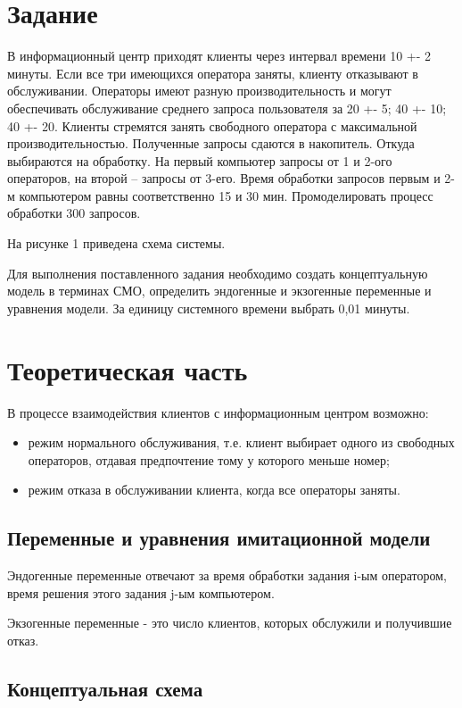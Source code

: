 
\section*{Задание}
В информационный центр приходят клиенты через интервал времени 10 +- 2 минуты. Если все три имеющихся оператора заняты, клиенту отказывают в обслуживании. Операторы имеют разную производительность и могут обеспечивать обслуживание среднего запроса пользователя за 20 +- 5; 40 +- 10; 40 +- 20. Клиенты стремятся занять свободного оператора с максимальной производительностью. Полученные запросы сдаются в накопитель. Откуда выбираются на обработку. На первый компьютер запросы от 1 и 2-ого операторов, на второй – запросы от 3-его. Время обработки запросов первым и 2-м компьютером равны соответственно 15 и 30 мин. Промоделировать процесс обработки 300 запросов.

На рисунке 1 приведена схема системы.

Для выполнения поставленного задания необходимо создать концептуальную модель в терминах СМО, определить эндогенные и экзогенные переменные и уравнения модели. За единицу системного времени выбрать 0,01 минуты.



\section*{Теоретическая часть}
В процессе взаимодействия клиентов с информационным центром возможно:
\begin{itemize}
	\item режим нормального обслуживания, т.е. клиент выбирает одного из свободных операторов, отдавая предпочтение тому у которого меньше номер;
	\item режим отказа в обслуживании клиента, когда все операторы заняты. 
\end{itemize}


\subsection*{Переменные и уравнения имитационной модели}
Эндогенные переменные отвечают за время обработки задания i-ым оператором, время решения этого задания j-ым компьютером.

Экзогенные переменные - это число клиентов, которых обслужили и получившие отказ.


\subsection*{Концептуальная схема}

